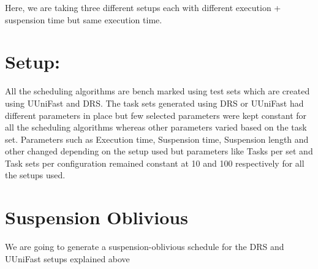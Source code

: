 \documentclass[]{article}
\begin{document}
{\raggedleft
Here, we are taking three different setups each with different execution + suspension time but same execution time.
}


	\clearpage

\section*{Setup:}    

{
\raggedleft \newline
 
All the scheduling algorithms are bench marked using test sets which are created using UUniFast and DRS. The task sets generated using DRS or UUniFast had different parameters in place but few selected parameters were kept constant for all the scheduling algorithms whereas other parameters varied based on the task set. Parameters such as Execution time, Suspension time, Suspension length and other changed depending on the setup used but parameters like Tasks per set and Task sets per configuration remained constant at 10 and 100 respectively for all the setups used.
}

	\clearpage

\section{Suspension Oblivious}

{
\raggedleft We are going to generate a suspension-oblivious schedule for the DRS and UUniFast setups explained above \newline
}
	
\end{document}

